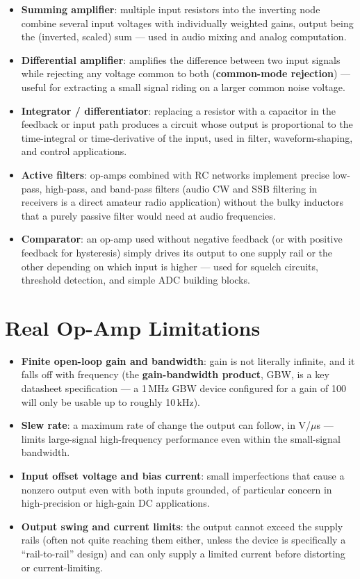 \begin{itemize}
\item \textbf{Summing amplifier}: multiple input resistors into the
inverting node combine several input voltages with individually
weighted gains, output being the (inverted, scaled) sum --- used in
audio mixing and analog computation.
\item \textbf{Differential amplifier}: amplifies the difference between
two input signals while rejecting any voltage common to both
(\textbf{common-mode rejection}) --- useful for extracting a small
signal riding on a larger common noise voltage.
\item \textbf{Integrator / differentiator}: replacing a resistor with a
capacitor in the feedback or input path produces a circuit whose output
is proportional to the time-integral or time-derivative of the input,
used in filter, waveform-shaping, and control applications.
\item \textbf{Active filters}: op-amps combined with RC networks
implement precise low-pass, high-pass, and band-pass filters (audio CW
and SSB filtering in receivers is a direct amateur radio application)
without the bulky inductors that a purely passive filter would need at
audio frequencies.
\item \textbf{Comparator}: an op-amp used without negative feedback (or
with positive feedback for hysteresis) simply drives its output to one
supply rail or the other depending on which input is higher --- used for
squelch circuits, threshold detection, and simple ADC building blocks.
\end{itemize}

\section{Real Op-Amp Limitations}

\begin{itemize}
\item \textbf{Finite open-loop gain and bandwidth}: gain is not
literally infinite, and it falls off with frequency (the
\textbf{gain-bandwidth product}, GBW, is a key datasheet specification
--- a 1\,MHz GBW device configured for a gain of 100 will only be
usable up to roughly 10\,kHz).
\item \textbf{Slew rate}: a maximum rate of change the output can
follow, in V/$\mu$s --- limits large-signal high-frequency performance
even within the small-signal bandwidth.
\item \textbf{Input offset voltage and bias current}: small
imperfections that cause a nonzero output even with both inputs
grounded, of particular concern in high-precision or high-gain DC
applications.
\item \textbf{Output swing and current limits}: the output cannot
exceed the supply rails (often not quite reaching them either, unless
the device is specifically a ``rail-to-rail'' design) and can only
supply a limited current before distorting or current-limiting.
\end{itemize}

